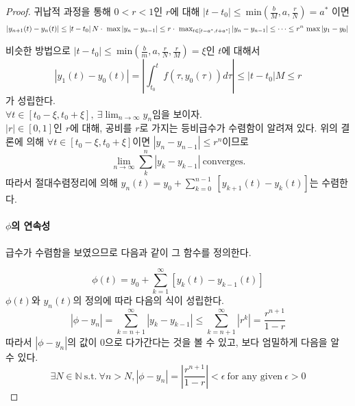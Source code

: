 \documentclass[a4paper,10pt]{article}
\begin{document}
\begin{proof}
귀납적 과정을 통해 $0 < r < 1$인 $r$에 대해 $|t - t_0| \leq \ \text{min}\left( \frac{b}{M}, a, \frac{r}{N} \right) = a^*$ 이면
   \begin{displaymath}
    \left| y_{n+1}(t) - y_n(t) \right| \leq \left| t - t_0 \right|N \cdot \ \text{max}\left| y_n - y_{n-1} \right| \leq r \cdot \ \text{max}_{t \in [t - a^*, t + a^*]}\left| y_n - y_{n-1} \right| \leq \cdots \leq r^n \ \text{max}\left| y_1 - y_0 \right|\\
\end{displaymath} 


비슷한 방법으로 $|t - t_0| \leq \ \text{min}\left( \frac{b}{m}, a, \frac{r}{N}, \frac{r}{M}\right) = \xi$인 $t$에 대해서
\begin{displaymath}
    \left| y_{1}(t) - y_0(t) \right| = \left| \int_{t_0}^t f(\tau, y_0(\tau))d \tau \right| \leq |t-t_0| M \leq r
\end{displaymath}
가 성립한다.
\\


$\displaystyle{\forall t \in [t_0 - \xi, t_0 + \xi], \ \exists \lim_{n \to \infty} y_n}$임을 보이자.\\

$|r| \in [0,1]$인 $r$에 대해, 공비를 $r$로 가지는 등비급수가 수렴함이 알려져 있다. 위의 결론에 의해 $\displaystyle{\forall t \in [t_0 - \xi, t_0 + \xi]}$이면 $\displaystyle{|y_n - y_{n-1}| \leq r^{n}}$이므로 \begin{displaymath}
    \lim_{n \to \infty} \sum_{k}^{n} \left| y_k - y_{k-1} \right| \ \text{converges.}
\end{displaymath}
따라서 절대수렴정리에 의해 $\displaystyle{y_n(t) = y_0 + \sum_{k = 0}^{n-1} \ \left[y_{k+1}(t) - y_k(t)\right]}$는 수렴한다.\\

\paragraph{$\phi$의 연속성}
급수가 수렴함을 보였으므로 다음과 같이 그 함수를 정의한다.

\begin{displaymath}
    \phi(t) = y_0 + \sum_{k = 1}^{\infty}[y_k(t) - y_{k-1}(t)]
\end{displaymath}
$\phi(t)$와 $y_n(t)$의 정의에 따라 다음의 식이 성립한다.
\begin{displaymath}
    \left| \phi - y_n \right| = \sum_{k = n+1}^\infty \left| y_k - y_{k-1} \right| \leq \sum_{k = n+1}^\infty \left| r^k \right| = \frac{r^{n+1}}{1-r}
\end{displaymath}
따라서 $|\phi - y_n|$의 값이 0으로 다가간다는 것을 볼 수 있고, 보다 엄밀하게 다음을 알 수 있다.
\begin{equation}
  \exists N \in \mathbb{N} \ \text{s.t.} \ \forall n > N, |\phi - y_n| = \left| \frac{r^{n+1}}{1-r} \right| < \epsilon \ \text{for any given} \ \epsilon > 0 \tag{\ast} \label{flooreq}
\end{equation}


\end{proof}
\end{document}
